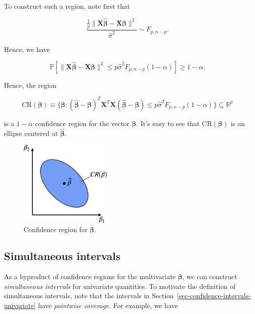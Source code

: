 \documentclass[
  11pt,
  letterpaper,
  oneside]{book}
\theoremstyle{plain}
\theoremstyle{plain}
\theoremstyle{definition}
\theoremstyle{definition}
\theoremstyle{plain}
\theoremstyle{remark}
\begin{document}
To construct such a region, note first that

\[
\frac{\frac{1}{p}\|\boldsymbol{X} \boldsymbol{\widehat{\beta}} - \boldsymbol{X} \boldsymbol{\beta}\|^2}{\widehat{\sigma}^2} \sim F_{p, n-p}.
\]

Hence, we have

\[
\mathbb{P}[\|\boldsymbol{X} \boldsymbol{\widehat{\beta}} - \boldsymbol{X} \boldsymbol{\beta}\|^2 \leq p \widehat{\sigma}^2 F_{p, n-p}(1-\alpha)] \geq 1-\alpha.
\]

Hence, the region

\[
\text{CR}(\boldsymbol{\beta}) \equiv \{\boldsymbol{\beta}: (\boldsymbol{\widehat{\beta}} - \boldsymbol{\beta})^T \boldsymbol{X}^T \boldsymbol{X} (\boldsymbol{\widehat{\beta}} - \boldsymbol{\beta})  \leq p \widehat{\sigma}^2 F_{p, n-p}(1-\alpha)\} \subseteq \mathbb{R}^p
\]

is a \(1-\alpha\) confidence region for the vector
\(\boldsymbol{\beta}\). It's easy to see that
\(\text{CR}(\boldsymbol{\beta})\) is an ellipse centered at
\(\boldsymbol{\widehat{\beta}}\).

\begin{figure}

{\centering \includegraphics[width=0.4\textwidth,height=\textheight]{figures/confidence-regions.jpg}

}

\caption{\label{fig-confidence-region}Confidence region for
\(\boldsymbol \beta\).}

\end{figure}

\hypertarget{simultaneous-intervals}{%
\subsection{Simultaneous intervals}\label{simultaneous-intervals}}

As a byproduct of confidence regions for the multivariate
\(\boldsymbol \beta\), we can construct \emph{simultaneous intervals}
for univariate quantities. To motivate the definition of simultaneous
intervals, note that the intervals in
Section~\ref{sec-confidence-intervals-univariate} have \emph{pointwise
coverage}. For example, we have
\end{document}
